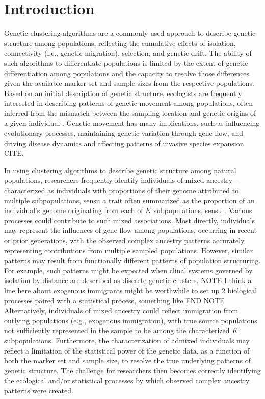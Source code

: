 
\section*{Introduction}

Genetic clustering algorithms are a commonly used approach to describe genetic structure among populations, reflecting the cumulative effects of isolation, connectivity (i.e., genetic migration), selection, and genetic drift.  The ability of such algorithms to differentiate populations is limited by the extent of genetic differentiation among populations and the capacity to resolve those differences given the available marker set and sample sizes from the respective populations.  Based on an initial description of genetic structure, ecologists are frequently interested in describing patterns of genetic movement among populations, often inferred from the mismatch between the sampling location and genetic origins of a given individual \citep{paetkau1995microsatellite,wilson2003bayesian}.  Genetic movement has many implications, such as influencing evolutionary processes, maintaining genetic variation through gene flow, and driving disease dynamics \citep{huestis2019windborne} and affecting patterns of invasive species expansion CITE.

	In using clustering algorithms to describe genetic structure among natural populations, researchers frequently identify individuals of mixed ancestry--- 
	characterized as individuals with proportions of their genome attributed to multiple subpopulations, sensu \citet{pritchard2000inference.}
	a trait often summarized as the proportion of an individual’s genome originating from each of $K$ subpopulations, sensu \citet{pritchard2000inference}.  Various processes could contribute to such mixed associations.  Most directly, individuals may represent the influences of gene flow among populations, occurring in recent or prior generations, with the observed complex ancestry patterns accurately representing contributions from multiple sampled populations.  However, similar patterns may result from functionally different patterns of population structuring.  For example, such patterns might be expected when clinal systems governed by isolation by distance are described as discrete genetic clusters. 
	NOTE I think a line here about exogenous immigrants might be worthwhile to set up 2 biological processes paired with a statistical process, something like END NOTE
	Alternatively, individuals of mixed ancestry could reflect immigration from outlying populations (e.g., exogenous immigration), with true source populations not sufficiently
	represented in the sample to be among the characterized $K$ subpopulations.
	Furthermore, the characterization of admixed individuals may reflect a limitation of the statistical power of the genetic data, 
	as a function of both the marker set and sample size, to resolve the true underlying patterns of genetic structure. 
	 The challenge for researchers then becomes correctly identifying the ecological and/or statistical processes by which observed complex ancestry patterns were created.

